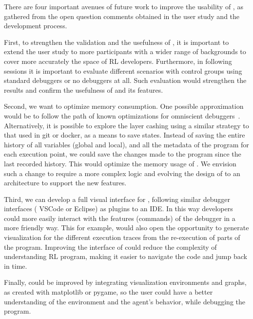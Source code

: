 There are four important avenues of future work to improve the usability of \flik, as gathered from the 
open question comments obtained in the user study and the development process. 

First, to strengthen the validation and the usefulness of \flik, it is important to extend the user study to 
more participants with a wider range of backgrounds to cover more accurately the space of \ac{RL} 
developers. Furthermore, in following sessions it is important to evaluate different scenarios with 
control groups using standard debuggers or no debuggers at all. Such evaluation would strengthen the 
results and confirm the usefulness of \flik and its features. 

Second, we want to optimize memory consumption. One possible approximation would be to follow the 
path of known optimizations for omniscient debuggers~\cite{pothier07}. Alternatively, it is possible to 
explore the layer cashing using a similar strategy to that 
used in git or docker, as a means to save states. Instead of saving the entire history of all variables 
(global and local), and all the metadata of the program for each execution point, we could 
save the changes made to the program since the last recorded history. This would optimize the 
memory usage of \flik. We envision such a change to require a more complex logic and evolving the 
design of \flik to an architecture to support the new features. 

Third, we can develop a full visual interface for \flik, following similar debugger interfaces (\eg 
VSCode or Eclipse) as plugins to an IDE. In this way developers could more easily interact with the 
features (commands) of the debugger in a more friendly way. This for example, would also open the 
opportunity to generate visualization for the different execution traces from the re-execution of parts of 
the program. Improving the interface of \flik could reduce the complexity of understanding \ac{RL} 
program, making it easier to navigate the code and jump back in time.

Finally, \flik could be improved by integrating visualization environments and graphs, as created with 
matplotlib or pygame, so the user could have a better understanding of the environment and the 
agent's behavior, while debugging the program.


\endinput
